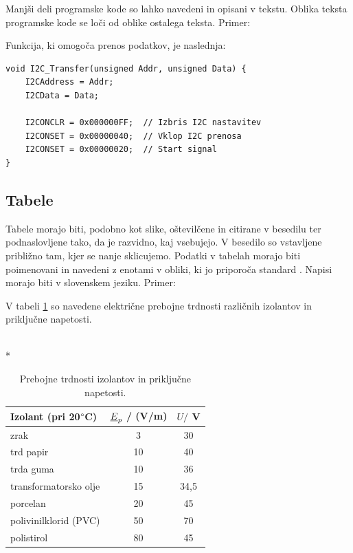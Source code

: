 \documentclass[a4paper,twoside,openright,12pt,slovene]{book}
\begin{document}
Manjši deli programske kode so lahko navedeni in opisani v tekstu. Oblika teksta programske kode se loči od oblike ostalega teksta.
Primer:

Funkcija, ki omogoča prenos podatkov, je naslednja:

\lstset{language=C}
\begin{lstlisting}
void I2C_Transfer(unsigned Addr, unsigned Data) {
    I2CAddress = Addr;
    I2CData = Data;

    I2CONCLR = 0x000000FF;  // Izbris I2C nastavitev
    I2CONSET = 0x00000040;  // Vklop I2C prenosa
    I2CONSET = 0x00000020;  // Start signal
}
\end{lstlisting}

\subsection{Tabele} \label{vnos_tabel}

Tabele morajo biti, podobno kot slike, oštevilčene in citirane v besedilu ter podnaslovljene tako, da je razvidno, kaj vsebujejo. V besedilo so vstavljene približno tam, kjer se nanje sklicujemo. Podatki v tabelah morajo biti poimenovani in navedeni z enotami v obliki, ki jo priporoča standard \cite{standard_sist_v, standard_sist_80000}. Napisi morajo biti v slovenskem jeziku. Primer:

V tabeli \ref{prebojne_trdnosti} so navedene električne prebojne trdnosti različnih izolantov in priključne napetosti.

\begin{footnotesize}
\begin{table}[h]
    \centering
    \caption{\label{prebojne_trdnosti} Prebojne trdnosti izolantov in priključne napetosti.}
    ~\\*\begin{tabular}{lcc} \hline
        Izolant (pri 20$\degree$C) & $\emph{E}_p$ / (V/m) & $U /$ V \\ \hline
        zrak                  & 3                    & 30      \\
        trd papir             & 10                   & 40      \\
        trda guma             & 10                   & 36      \\
        transformatorsko olje & 15                   & 34,5    \\
        porcelan              & 20                   & 45      \\
        polivinilklorid (PVC) & 50                   & 70      \\
        polistirol            & 80                   & 45      \\ \hline
    \end{tabular}
\end{table}
\end{footnotesize}
\end{document}
